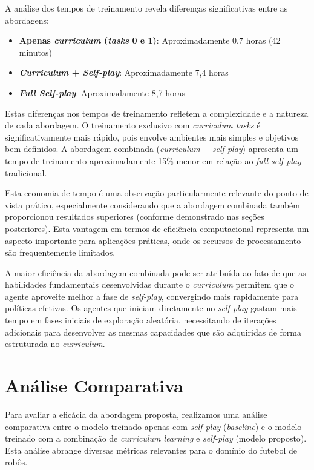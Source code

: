 A análise dos tempos de treinamento revela diferenças significativas entre as abordagens:

\begin{itemize}
    \item \textbf{Apenas \textit{curriculum} (\textit{tasks} 0 e 1)}: Aproximadamente 0,7 horas (42 minutos)
    \item \textbf{\textit{Curriculum} + \textit{Self-play}}: Aproximadamente 7,4 horas
    \item \textbf{\textit{Full Self-play}}: Aproximadamente 8,7 horas
\end{itemize}

Estas diferenças nos tempos de treinamento refletem a complexidade e a natureza de cada abordagem. O treinamento exclusivo com \textit{curriculum tasks} é significativamente mais rápido, pois envolve ambientes mais simples e objetivos bem definidos. A abordagem combinada (\textit{curriculum} + \textit{self-play}) apresenta um tempo de treinamento aproximadamente 15\% menor em relação ao \textit{full self-play} tradicional.

Esta economia de tempo é uma observação particularmente relevante do ponto de vista prático, especialmente considerando que a abordagem combinada também proporcionou resultados superiores (conforme demonstrado nas seções posteriores). Esta vantagem em termos de eficiência computacional representa um aspecto importante para aplicações práticas, onde os recursos de processamento são frequentemente limitados.

A maior eficiência da abordagem combinada pode ser atribuída ao fato de que as habilidades fundamentais desenvolvidas durante o \textit{curriculum} permitem que o agente aproveite melhor a fase de \textit{self-play}, convergindo mais rapidamente para políticas efetivas. Os agentes que iniciam diretamente no \textit{self-play} gastam mais tempo em fases iniciais de exploração aleatória, necessitando de iterações adicionais para desenvolver as mesmas capacidades que são adquiridas de forma estruturada no \textit{curriculum}.

\section{Análise Comparativa}
\label{sec:analise_comparativa}

Para avaliar a eficácia da abordagem proposta, realizamos uma análise comparativa entre o modelo treinado apenas com \textit{self-play} (\textit{baseline}) e o modelo treinado com a combinação de \textit{curriculum learning} e \textit{self-play} (modelo proposto). Esta análise abrange diversas métricas relevantes para o domínio do futebol de robôs.

